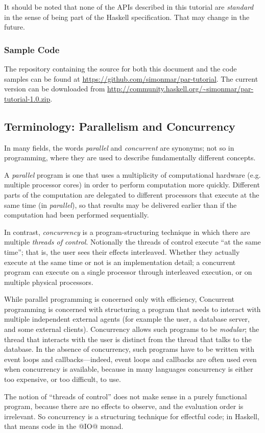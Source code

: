 \documentclass[11pt,a4paper]{article}
\newcommand{\Subsection}[2]{\subsection{#2}\label{sec:#1}}
\newcommand{\Subsubsection}[2]{\subsubsection{#2}\label{sec:#1}}
\newcommand{\version}{1.0}
\begin{document}
It should be noted that none of the APIs described in this tutorial
are \emph{standard} in the sense of being part of the Haskell
specification.  That may change in the future.

\Subsubsection{sample}{Sample Code}

The repository containing the source for both this document and the
code samples can be found at
\url{https://github.com/simonmar/par-tutorial}.  The current version
can be downloaded from
\url{http://community.haskell.org/~simonmar/par-tutorial-\version.zip}.

\Subsection{terminology}{Terminology: Parallelism and Concurrency}

In many fields, the words \emph{parallel} and \emph{concurrent} are
synonyms; not so in programming, where they are used to describe
fundamentally different concepts.

A \emph{parallel} program is one that uses a multiplicity of
computational hardware (e.g. multiple processor cores) in order to
perform computation more quickly.  Different parts of the computation
are delegated to different processors that execute at the same time
(in \emph{parallel}), so that results may be delivered earlier than if
the computation had been performed sequentially.

In contrast, \emph{concurrency} is a program-structuring technique in
which there are multiple \emph{threads of control}.  Notionally the
threads of control execute ``at the same time''; that is, the user
sees their effects interleaved.  Whether they actually execute at the
same time or not is an implementation detail; a concurrent program can
execute on a single processor through interleaved execution, or on
multiple physical processors.

While parallel programming is concerned only with efficiency,
Concurrent programming is concerned with structuring a program that
needs to interact with multiple independent external agents (for
example the user, a database server, and some external clients).
Concurrency allows such programs to be \emph{modular}; the thread that
interacts with the user is distinct from the thread that talks to the
database.  In the absence of concurrency, such programs have to be
written with event loops and callbacks---indeed, event loops and
callbacks are often used even when concurrency is available, because
in many languages concurrency is either too expensive, or too
difficult, to use.

The notion of ``threads of control'' does not make sense in a purely
functional program, because there are no effects to observe, and the
evaluation order is irrelevant.  So concurrency is a structuring
technique for effectful code; in Haskell, that means code in the @IO@
monad.
\end{document}
